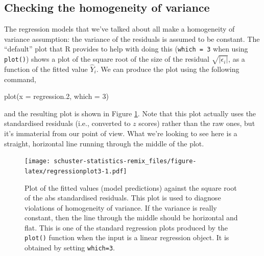 \documentclass[
]{book}
\newenvironment{Shaded}{\begin{snugshade}}{\end{snugshade}}
\newcommand{\AttributeTok}[1]{\textcolor[rgb]{0.77,0.63,0.00}{#1}}
\newcommand{\DecValTok}[1]{\textcolor[rgb]{0.00,0.00,0.81}{#1}}
\newcommand{\FloatTok}[1]{\textcolor[rgb]{0.00,0.00,0.81}{#1}}
\newcommand{\FunctionTok}[1]{\textcolor[rgb]{0.00,0.00,0.00}{#1}}
\newcommand{\NormalTok}[1]{#1}
\begin{document}
\hypertarget{regressionhomogeneity}{%
\subsection{Checking the homogeneity of variance}\label{regressionhomogeneity}}

The regression models that we've talked about all make a homogeneity of variance assumption: the variance of the residuals is assumed to be constant. The ``default'' plot that R provides to help with doing this (\texttt{which\ =\ 3} when using \texttt{plot()}) shows a plot of the square root of the size of the residual \(\sqrt{|\epsilon_i|}\), as a function of the fitted value \(\hat{Y}_i\). We can produce the plot using the following command,

\begin{Shaded}
\begin{Highlighting}[]
\FunctionTok{plot}\NormalTok{(}\AttributeTok{x =}\NormalTok{ regression}\FloatTok{.2}\NormalTok{, }\AttributeTok{which =} \DecValTok{3}\NormalTok{)}
\end{Highlighting}
\end{Shaded}

and the resulting plot is shown in Figure \ref{fig:regressionplot3}. Note that this plot actually uses the standardised residuals (i.e., converted to \(z\) scores) rather than the raw ones, but it's immaterial from our point of view. What we're looking to see here is a straight, horizontal line running through the middle of the plot.

\begin{figure}
\centering
\texttt{[image: schuster-statistics-remix\_files/figure-latex/regressionplot3-1.pdf]}
\caption{\label{fig:regressionplot3}Plot of the fitted values (model predictions) against the square root of the abs standardised residuals. This plot is used to diagnose violations of homogeneity of variance. If the variance is really constant, then the line through the middle should be horizontal and flat. This is one of the standard regression plots produced by the \texttt{plot()} function when the input is a linear regression object. It is obtained by setting \texttt{which=3}.}
\end{figure}
\end{document}
